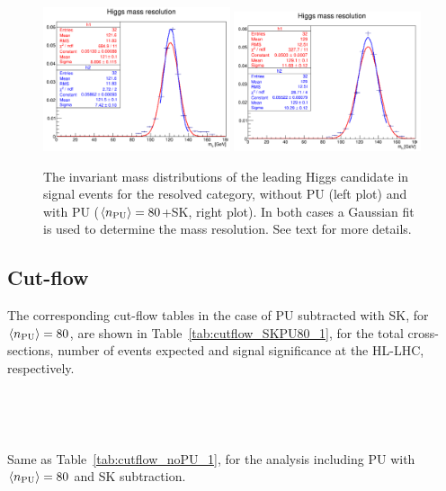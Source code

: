 \begin{figure}[t]
  \begin{center}
    \vspace{-1cm}
  \includegraphics[width=0.49\textwidth]{plots/higgs_mass_res_noPU.pdf}
  \includegraphics[width=0.49\textwidth]{plots/higgs_mass_res_PU80.pdf}
  \caption{\small The invariant mass distributions of the leading
    Higgs candidate in signal events for the resolved category, without
    PU (left plot) and with PU ($\left\langle n_{\rm PU}\right\rangle=80$+SK, right plot).
    In both cases a Gaussian fit is used to determine the mass resolution.
    See text for more details.
}
\label{fig:higgs-mass-resolution}
\end{center}
\end{figure}

\subsection{Cut-flow}



The corresponding cut-flow tables in the case
of PU subtracted with SK, for $\left\langle n_{\rm PU}\right\rangle=80$,
are shown in Table~\ref{tab:cutflow_SKPU80_1},
for the total cross-sections, number of events expected and
signal significance at the HL-LHC, respectively.

\begin{table}[t]
  \centering
  \scriptsize
  
  $\,$ \\
  \vspace{0.5cm}
  
  $\,$ \\
  \vspace{0.5cm}
    
    \caption{\small
      Same as Table~\ref{tab:cutflow_noPU_1}, for the analysis
      including PU with $\left\langle n_{\rm PU}\right\rangle=80$ and SK subtraction.
      \label{tab:cutflow_SKPU80_1}}
\end{table}



